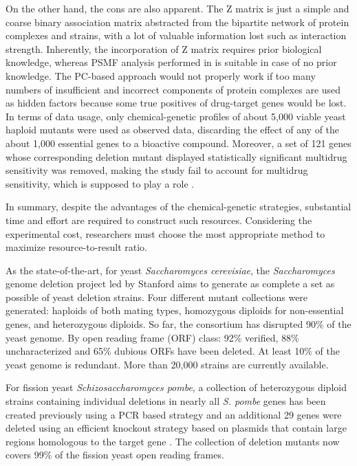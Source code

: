 \documentclass[12pt,fullpage,singlespace]{article}
\begin{document}
On the other hand, the cons are also apparent. The Z matrix is just a simple and coarse binary association matrix abstracted from the bipartite network of protein complexes and strains, with a lot of valuable information lost such as interaction strength. Inherently, the incorporation of Z matrix requires prior biological knowledge, whereas PSMF analysis performed in \citep{1078} is suitable in case of no prior knowledge. The PC-based approach would not properly work if too many numbers of insufficient and incorrect components of protein complexes are used as hidden factors because some true positives of drug-target genes would be lost. In terms of data usage, only chemical-genetic profiles of about 5,000 viable yeast haploid mutants were used as observed data, discarding the effect of any of the about 1,000 essential genes to a bioactive compound. Moreover, a set of 121 genes whose corresponding deletion mutant displayed statistically significant multidrug sensitivity was removed, making the study fail to account for multidrug sensitivity, which is supposed to play a role \citep{1080}.

In summary, despite the advantages of the chemical-genetic strategies, substantial time and effort are required to construct such resources. Considering the experimental cost, researchers must choose the most appropriate method to maximize resource-to-result ratio.

As the state-of-the-art, for yeast \textit{Saccharomyces cerevisiae}, the \textit{Saccharomyces} genome deletion project led by Stanford \citep{1107} aims to generate as complete a set as possible of yeast deletion strains. Four different mutant collections were generated: haploids of both mating types, homozygous diploids for non-essential genes, and heterozygous diploids. So far, the consortium has disrupted 90\% of the yeast genome. By open reading frame (ORF) class: 92\% verified, 88\% uncharacterized and 65\% dubious ORFs have been deleted. At least 10\% of the yeast genome is redundant. More than 20,000 strains are currently available.

For fission yeast \textit{Schizosaccharomyces pombe}, a collection of heterozygous diploid strains containing individual deletions in nearly all \textit{S. pombe} genes has been created previously using a PCR based strategy and an additional 29 genes were deleted using an efficient knockout strategy based on plasmids that contain large regions homologous to the target gene \citep{1108}. The collection of deletion mutants now covers 99\% of the fission yeast open reading frames.
\end{document}
